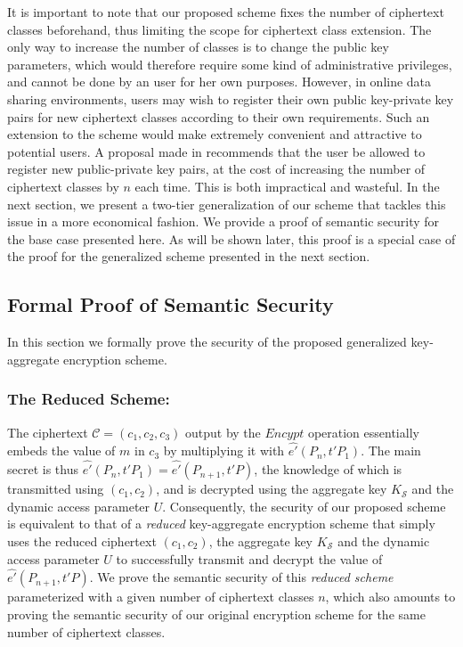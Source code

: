 It is important to note that our proposed scheme fixes the number of ciphertext classes beforehand, thus limiting the scope for ciphertext class extension. The only way to increase the number of classes is to change the public key parameters, which would therefore require some kind of administrative privileges, and cannot be done by an user for her own purposes. However, in online data sharing environments, users may wish to register their own public key-private key pairs for new ciphertext classes according to their own requirements. Such an extension to the scheme would make extremely convenient and attractive to potential users. A proposal made in \cite{chu2014key} recommends that the user be allowed to register new public-private key pairs, at the cost of increasing the number of ciphertext classes by $n$ each time. This is both impractical and wasteful. In the next section, we present a two-tier generalization of our scheme that tackles this issue in a more economical fashion. We provide a proof of semantic security for the base case presented here. As will be shown later, this proof is a special case of the proof for the generalized scheme presented in the next section.  

\subsection{Formal Proof of Semantic Security}

In this section we formally prove the security of the proposed generalized key-aggregate encryption scheme. 

\subsubsection{The Reduced Scheme:}

The ciphertext $\mathcal{C}=(c_1,c_2,c_3)$ output by the $Encypt$ operation essentially embeds the value of $m$ in $c_3$ by multiplying it with $\hat{e'}(P_{n},t'P_1)$. The main secret is thus $\hat{e'}(P_{n},t'P_1)=\hat{e'}(P_{n+1},t'P)$, the knowledge of which is transmitted using $(c_1,c_2)$, and is decrypted using the aggregate key $K_{\mathcal{S}}$ and the dynamic access parameter $U$. Consequently, the security of our proposed scheme is equivalent to that of a \emph{reduced} key-aggregate encryption scheme that simply uses the reduced ciphertext $(c_1,c_2)$, the aggregate key $K_{\mathcal{S}}$ and the dynamic access parameter $U$ to successfully transmit and decrypt the value of $\hat{e'}(P_{n+1},t'P)$. We prove the semantic security of this \emph{reduced scheme} parameterized with a given number of ciphertext classes $n$, which also amounts to proving the semantic security of our original encryption scheme for the same number of ciphertext classes.

